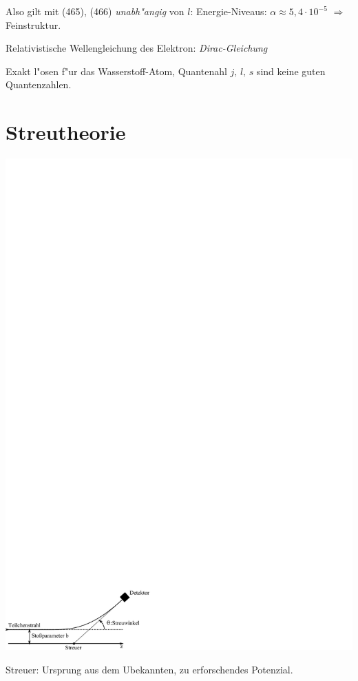 \documentclass[a4paper]{scrartcl}
\begin{document}
Also gilt mit (465), (466) \emph{unabh"angig} von $l$:
Energie-Niveaus:
$\alpha \approx 5,4 \cdot 10^{-5}$ $\Longrightarrow$ Feinstruktur.

Relativistische Wellengleichung des Elektron: \emph{Dirac-Gleichung}

Exakt l"osen f"ur das Wasserstoff-Atom, Quantenahl $j, \, l, \, s$ sind keine guten Quantenzahlen.

\section{Streutheorie}

\begin{center}
\includegraphics{469Streu}
\end{center}
Streuer: Ursprung aus dem Ubekannten, zu erforschendes Potenzial.
\end{document}
